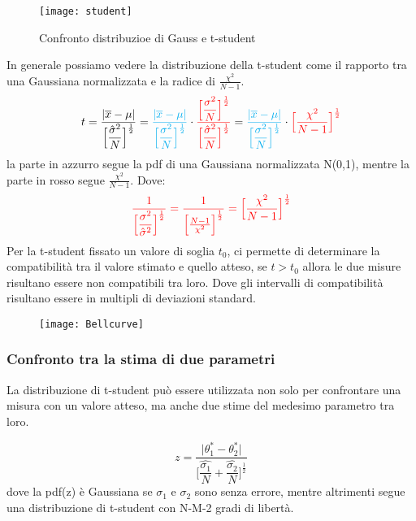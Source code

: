   
\begin{figure}[ht]
\vspace{0.1in}
\texttt{[image: student]}	
\centering
\vspace{0.1in}
\caption{Confronto distribuzioe di Gauss e t-student}
\end{figure}
In generale possiamo vedere la distribuzione della t-student come il rapporto tra una Gaussiana normalizzata e la radice di  $\frac{\chi^2}{N-1}$.
\begin{equation*}
	t = \dfrac{\vert \overline{x} - \mu \vert}{\Big [{\dfrac{\hat{\sigma}^2}{N}} \Big ]^{\frac{1}{2}}} = \textcolor{cyan}{\dfrac{\vert \overline{x} - \mu \vert}{\Big [{\dfrac{\sigma^2}{N}} \Big ]^{\frac{1}{2}}}} \cdot \textcolor{red}{\dfrac{\Big [ \dfrac{\sigma^2}{N} \Big]^{\frac{1}{2}}}{\Big [ \dfrac{\hat{\sigma}^2}{N} \Big]^{\frac{1}{2}}}} = \textcolor{cyan}{\dfrac{\vert \overline{x} - \mu \vert}{\Big [{\dfrac{\sigma^2}{N}} \Big ]^{\frac{1}{2}}}} \cdot \textcolor{red}{\Big [ \dfrac{\chi^2}{N-1} \Big ]^{\frac{1}{2}}}  
\end{equation*}
la parte in azzurro segue la pdf di una Gaussiana normalizzata N(0,1), mentre la parte in rosso segue $\frac{\chi^2}{N-1}$. Dove:
\begin{equation*}
	\textcolor{red}{\dfrac{1}{\Big [ \dfrac{\sigma^2}{\hat{\sigma}^2} \Big ]^{\frac{1}{2}}} = \dfrac{1}{\Big[  \frac{N-1}{\chi^2} \Big ]^{\frac{1}{2}} } = \Big [ \dfrac{\chi^2}{N-1} \Big ]^{\frac{1}{2}}  } 
\end{equation*}
Per la t-student fissato un valore di soglia $t_0$, ci permette di determinare la compatibilit\`{a} tra il valore stimato e quello atteso, se $t>t_0$ allora le due misure risultano essere non compatibili tra loro. Dove gli intervalli di compatibilit\`{a} risultano essere in multipli di deviazioni standard.
\begin{figure}[ht]
\vspace{0.1in}
\texttt{[image: Bellcurve]}	
\centering
\end{figure}

\subsubsection{Confronto tra la stima di due parametri}

La distribuzione di t-student pu\`{o} essere utilizzata non solo per confrontare una misura con un valore atteso, ma anche due stime del medesimo parametro tra loro.

\begin{equation}
	z = \dfrac{\vert \theta^*_1 - \theta^*_2 \vert }{ \Big [\dfrac{\hat{\sigma_1}}{N} +\dfrac{\hat{\sigma_2}}{N} \Big ]^{\frac{1}{2}}}
\end{equation}
dove la pdf(z) \`{e} Gaussiana se $\sigma_1$ e $\sigma_2$ sono senza errore, mentre altrimenti segue una distribuzione di t-student con N-M-2 gradi di libert\`{a}.

